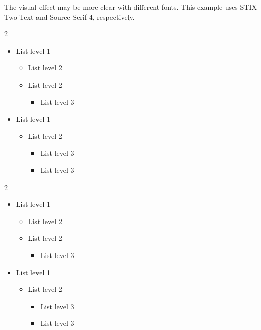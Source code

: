 \documentclass{beery}
\begin{document}
The visual effect may be more clear with different fonts.
This example uses STIX Two Text and Source Serif 4, respectively.

\begingroup
  \newfontfamilystixtwo
  \begin{multicols}{2}
    \begin{itemize}
      \item List level 1
      \begin{itemize}
        \item List level 2
        \item List level 2
        \begin{itemize}
          \item List level 3
        \end{itemize}
      \end{itemize}
      \item List level 1
      \begin{itemize}
        \item List level 2
        \begin{itemize}
          \item List level 3
          \item List level 3
        \end{itemize}
      \end{itemize}
    \end{itemize}
  \end{multicols}
\endgroup

\begingroup
  \newfontfamilysourceseriffour
  \begin{multicols}{2}
    \begin{itemize}
      \item List level 1
      \begin{itemize}
        \item List level 2
        \item List level 2
        \begin{itemize}
          \item List level 3
        \end{itemize}
      \end{itemize}
      \item List level 1
      \begin{itemize}
        \item List level 2
        \begin{itemize}
          \item List level 3
          \item List level 3
        \end{itemize}
      \end{itemize}
    \end{itemize}
  \end{multicols}
\endgroup
\end{document}
